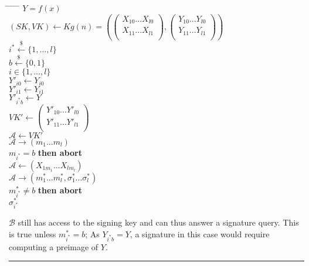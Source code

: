 \documentclass[twoside]{article}
\newenvironment{proof}{{\bf Proof:}}{\hfill\rule{2mm}{2mm}}
\begin{document}
\begin{proof}
\begin{tabbing}
\hspace*{.25in} \= \hspace*{.25in} \= \hspace*{.25in} \= \hspace*{.25in} \= \hspace*{.25in} \=\kill
{} $Y = f(x)$\\
\>$(SK, VK) \leftarrow Kg(n) = \left(
\begin{pmatrix}
X_{10}...X_{l0}\\
X_{11}...X_{l1}\\
\end{pmatrix},
\begin{pmatrix}
Y_{10}...Y_{l0}\\
Y_{11}...Y_{l1}\\
\end{pmatrix}\right)$\\
\>$i^* \xleftarrow{\$} \{1,...,l\} $\\
\>$b \xleftarrow{\$} \{0,1\}$\\
 $i \in \{1,...,l\}$\\
\>\>$Y'_{i0} \leftarrow Y_{i0}$\\
\>\>$Y'_{i1} \leftarrow Y_{i1}$\\
\>$Y'_{i^*b} \leftarrow Y$\\
\>$VK' \leftarrow
\begin{pmatrix}
Y'_{10}...Y'_{l0}\\
Y'_{11}...Y'_{l1}\\
\end{pmatrix}$\\
\>$\mathcal{A} \leftarrow VK'$\\
\>$\mathcal{A} \rightarrow (m_1...m_l)$\\
 $m_{i^*} = b$ {\bf then abort}\\
\>$\mathcal{A} \leftarrow (X_{1m_1}...X_{lm_l})$\\
\>$\mathcal{A} \rightarrow (m^*_1...m^*_l,\sigma^*_1...\sigma^*_l)$\\
 $m^*_{i^*} \neq b$ {\bf then abort}\\
 $\sigma^*_{i^*}$
\end{tabbing}

$\mathcal{B}$ still has access to the signing key and can thus answer a signature query. This is true unless $m^*_{i^*} = b$; As $Y_{i^*b} = Y$, a signature in this case would require computing a preimage of $Y$.


\end{proof}
\end{document}
